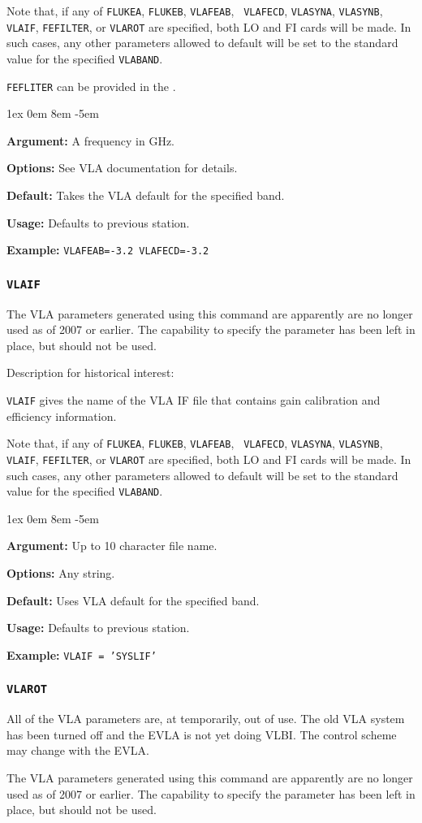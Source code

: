 \documentclass{report}
\newcommand{\rcwbox}[5]{
  \begin{list}{}{\parsep 1ex  \itemsep 0em
                 \leftmargin 8em  \itemindent -5em }
    \item {\bf Argument:} #1
    \item {\bf Options:}  #2
    \item {\bf Default:}  #3
    \item {\bf Usage:}    #4
    \item {\bf Example:}  #5
  \end{list}
}
\begin{document}
Note that, if any of {\tt FLUKEA}, {\tt FLUKEB}, {\tt VLAFEAB}, {\tt
VLAFECD}, {\tt VLASYNA}, {\tt VLASYNB}, {\tt VLAIF}, {\tt FEFILTER},
or {\tt VLAROT} are specified, both LO and FI cards will be made.  In
such cases, any other parameters allowed to default will be set to the
standard value for the specified {\tt VLABAND}.

{\tt FEFLITER} can be provided in the .

\rcwbox
{A frequency in GHz.}
{See VLA documentation for details.}
{Takes the VLA default for the specified band.}
{Defaults to previous station.}
{{\tt VLAFEAB=-3.2  VLAFECD=-3.2}}


\subsubsection{\label{SP:VLAIF}{\tt VLAIF}}

The VLA parameters generated using this command are apparently are no
longer used as of 2007 or earlier.  The capability to specify the
parameter has been left in place, but should not be used.

Description for historical interest:

{\tt VLAIF} gives the name of the VLA IF file that contains gain
calibration and efficiency information.

Note that, if any of {\tt FLUKEA}, {\tt FLUKEB}, {\tt VLAFEAB}, {\tt
VLAFECD}, {\tt VLASYNA}, {\tt VLASYNB}, {\tt VLAIF}, {\tt FEFILTER},
or {\tt VLAROT} are specified, both LO and FI cards will be made.  In
such cases, any other parameters allowed to default will be set to the
standard value for the specified {\tt VLABAND}.

\rcwbox
{Up to 10 character file name.}
{Any string.}
{Uses VLA default for the specified band.}
{Defaults to previous station.}
{{\tt VLAIF = 'SYSLIF'}}


\subsubsection{\label{SP:VLAROT}{\tt VLAROT}}

All of the VLA parameters are, at temporarily, out of use.  The old
VLA system has been turned off and the EVLA is not yet doing VLBI.
The control scheme may change with the EVLA.

The VLA parameters generated using this command are apparently are no
longer used as of 2007 or earlier.  The capability to specify the
parameter has been left in place, but should not be used.
\end{document}
